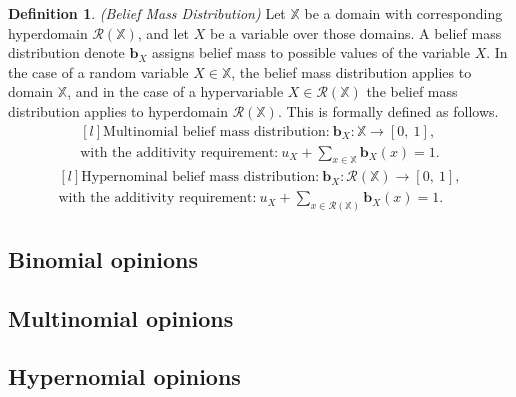 \documentclass[a4paper,12pt]{article}
\theoremstyle{definition}
\newtheorem{definition}{Definition}[section]
\numberwithin{equation}{section}
\begin{document}
\begin{definition}
	\emph{(Belief Mass Distribution)} Let $\mathbb{X}$ be a domain with corresponding hyperdomain $\mathcal{R}(\mathbb{X})$, and let $X$ be a variable over those domains. A belief mass distribution denote $\mathbf{b}_X$ assigns belief mass to possible values of the variable $X$. In the case of a random variable $X \in \mathbb{X}$, the belief mass distribution applies to domain $\mathbb{X}$, and in the case of a hypervariable $X \in \mathcal{R}(\mathbb{X})$ the belief mass distribution applies to hyperdomain $\mathcal{R}(\mathbb{X})$. This is formally defined as follows.
	\begin{equation}\label{eq:multinomial-belief-mass-dristribution}
		\begin{matrix*}[l]
			\text{Multinomial belief mass distribution:}\ \mathbf{b}_X : \mathbb{X} \rightarrow [0,\ 1], \\
			\text{with the additivity requirement:}\ u_X + \sum\limits_{x \in \mathbb{X}} \mathbf{b}_X(x) = 1\text{.}
		\end{matrix*}
	\end{equation}
	\begin{equation}\label{eq:hypernomal_belief_mass_distribution}
		\begin{matrix*}[l]
			\text{Hypernominal belief mass distribution:}\ \mathbf{b}_X : \mathcal{R}(\mathbb{X}) \rightarrow [0,\ 1], \\
			\text{with the additivity requirement:}\ u_X + \sum\limits_{x \in \mathcal{R}(\mathbb{X})} \mathbf{b}_X(x) = 1\text{.}
		\end{matrix*}
	\end{equation}
\end{definition}




\subsection{Binomial opinions}

\subsection{Multinomial opinions}

\subsection{Hypernomial opinions}
\end{document}
